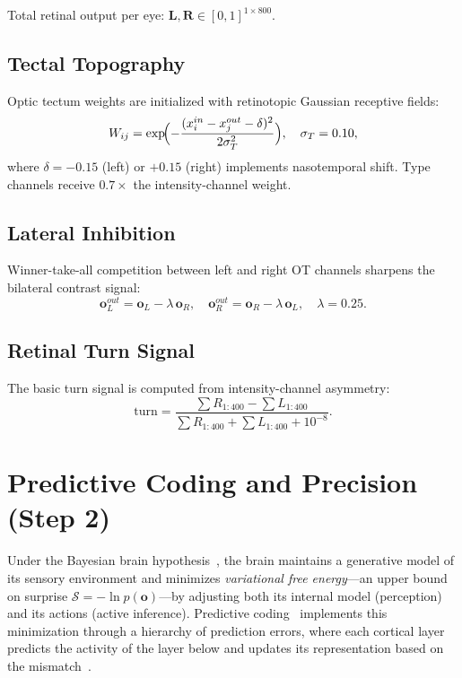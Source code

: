 \documentclass[11pt,a4paper]{article}
\begin{document}
Total retinal output per eye: $\mathbf{L}, \mathbf{R} \in [0,1]^{1\times 800}$.

\subsection{Tectal Topography}

Optic tectum weights are initialized with retinotopic Gaussian receptive
fields:
\begin{equation}\label{eq:topography}
  W_{ij} = \exp\!\Bigl(-\frac{(x_i^{in} - x_j^{out} - \delta)^2}{2\sigma_T^2}\Bigr),
  \quad \sigma_T = 0.10,
\end{equation}
where $\delta = -0.15$ (left) or $+0.15$ (right) implements nasotemporal shift.
Type channels receive $0.7\times$ the intensity-channel weight.

\subsection{Lateral Inhibition}

Winner-take-all competition between left and right OT channels sharpens the
bilateral contrast signal:
\begin{equation}\label{eq:latinh}
  \mathbf{o}_L^{out} = \mathbf{o}_L - \lambda\,\mathbf{o}_R,
  \quad
  \mathbf{o}_R^{out} = \mathbf{o}_R - \lambda\,\mathbf{o}_L,
  \quad \lambda = 0.25.
\end{equation}

\subsection{Retinal Turn Signal}

The basic turn signal is computed from intensity-channel asymmetry:
\begin{equation}\label{eq:turn}
  \text{turn} =
  \frac{\sum R_{1:400} - \sum L_{1:400}}
       {\sum R_{1:400} + \sum L_{1:400} + 10^{-8}}.
\end{equation}

\section{Predictive Coding and Precision (Step 2)}\label{sec:precision}

Under the Bayesian brain hypothesis~\cite{friston2010,clark2013}, the brain
maintains a generative model of its sensory environment and minimizes
\emph{variational free energy}---an upper bound on surprise
$\mathcal{S} = -\ln p(\mathbf{o})$---by adjusting both its internal model
(perception) and its actions (active inference).
Predictive coding~\cite{rao1999} implements this minimization through a
hierarchy of prediction errors, where each cortical layer predicts the
activity of the layer below and updates its representation based on
the mismatch~\cite{bogacz2017}.
\end{document}
